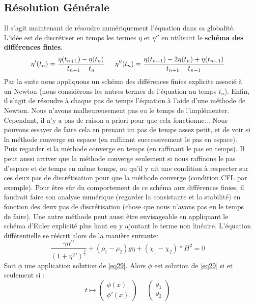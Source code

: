 \documentclass[10pt,a4paper]{article}
\begin{document}
\subsection{Résolution Générale}
Il s'agit maintenant de résoudre numériquement l'équation dans sa globalité. L'idée est de discrétiser en temps les termes $\eta$ et $\eta''$ en utilisant le \textbf{schéma des différences finies}. 
\begin{equation}
\eta'(t_n)=\frac{\eta(t_{n+1})-\eta(t_n)}{t_{n+1}-t_n} \indent
\eta''(t_n)=\frac{\eta(t_{n+1})-2\eta(t_n)+\eta(t_{n-1})}{t_{n+1}-t_{n-1}}
\label{eq29}
\end{equation}
Par la suite nous appliquons un schéma des différences finies explicite associé à un Newton (nous considèrons les autres termes de l'équation au temps $t_n$). Enfin, il s'agit de résoudre à chaque pas de temps l'équation à l'aide d'une méthode de Newton. Nous n'avons malheureusement pas eu le temps de l'implémenter.
\newline
Cependant, il n'y a pas de raison a priori pour que cela fonctionne... Nous pouvons essayer de faire cela en prenant un pas de temps assez petit, et de voir si la méthode converge en espace (en raffinant successivement le pas en espace). Puis regarder si la méthode converge en temps (en raffinant le pas en temps). Il peut aussi arriver que la méthode converge seulement si nous raffinons le pas d'espace et de temps en même temps, ou qu'il y ait une condition à respecter sur ces deux pas de discrétisation pour que la méthode converge (condition CFL par exemple). Pour être sûr du comportement de ce schéma aux différences finies, il faudrait faire son analyse numérique (regarder la consistante et la stabilité) en fonction des deux pas de discrétisation (chose que nous n'avons pas eu le temps de faire).
\newline
\newline
Une autre méthode peut aussi être envisageable en appliquant le schéma d'Euler explicité plus haut en y ajoutant le terme non linéaire. L'équation différentielle se réécrit alors de la manière suivante:
\begin{equation}
\frac{\gamma \eta\prime\prime}{(1+\eta^{2}\prime)^{\frac{3}{2}}} + (\rho_{1} - \rho_{2})g\eta +(\chi_1-\chi_2)*H^2=0
\end{equation}
Soit $\phi$ une application solution de \ref{eq29}. Alors $\phi$ est solution de \ref{eq29} si et seulement si :
\begin{equation}
t \mapsto\begin{pmatrix}
   \phi(x)  \\
   \phi\prime(x)
\end{pmatrix}=\begin{pmatrix}
	y_1 \\
	y_2
\end{pmatrix}
\end{equation}
\end{document}
